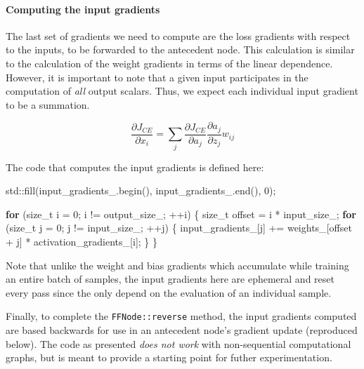 \documentclass[
]{article}
\newenvironment{Shaded}{}{}
\newcommand{\BuiltInTok}[1]{#1}
\newcommand{\ControlFlowTok}[1]{\textcolor[rgb]{0.00,0.44,0.13}{\textbf{#1}}}
\newcommand{\DataTypeTok}[1]{\textcolor[rgb]{0.56,0.13,0.00}{#1}}
\newcommand{\DecValTok}[1]{\textcolor[rgb]{0.25,0.63,0.44}{#1}}
\newcommand{\NormalTok}[1]{#1}
\newcommand{\VariableTok}[1]{\textcolor[rgb]{0.10,0.09,0.49}{#1}}
\begin{document}
\hypertarget{computing-the-input-gradients}{%
\paragraph{Computing the input
gradients}\label{computing-the-input-gradients}}

The last set of gradients we need to compute are the loss gradients with
respect to the inputs, to be forwarded to the antecedent node. This
calculation is similar to the calculation of the weight gradients in
terms of the linear dependence. However, it is important to note that a
given input participates in the computation of \emph{all} output
scalars. Thus, we expect each individual input gradient to be a
summation.

\[
\frac{\partial J_{CE}}{\partial x_i} = \sum_j \frac{\partial J_{CE}}{\partial a_j}\frac{\partial a_j}{\partial z_j}w_{ij}
\]

The code that computes the input gradients is defined here:

\begin{Shaded}
\begin{Highlighting}[]
    \BuiltInTok{std::}\NormalTok{fill(}\VariableTok{input\_gradients\_}\NormalTok{.begin(), }\VariableTok{input\_gradients\_}\NormalTok{.end(), }\DecValTok{0}\NormalTok{);}

    \ControlFlowTok{for}\NormalTok{ (}\DataTypeTok{size\_t}\NormalTok{ i = }\DecValTok{0}\NormalTok{; i != }\VariableTok{output\_size\_}\NormalTok{; ++i)}
\NormalTok{    \{}
        \DataTypeTok{size\_t}\NormalTok{ offset = i * }\VariableTok{input\_size\_}\NormalTok{;}
        \ControlFlowTok{for}\NormalTok{ (}\DataTypeTok{size\_t}\NormalTok{ j = }\DecValTok{0}\NormalTok{; j != }\VariableTok{input\_size\_}\NormalTok{; ++j)}
\NormalTok{        \{}
            \VariableTok{input\_gradients\_}\NormalTok{[j]}
\NormalTok{                += }\VariableTok{weights\_}\NormalTok{[offset + j] * }\VariableTok{activation\_gradients\_}\NormalTok{[i];}
\NormalTok{        \}}
\NormalTok{    \}}
\end{Highlighting}
\end{Shaded}

Note that unlike the weight and bias gradients which accumulate while
training an entire batch of samples, the input gradients here are
ephemeral and reset every pass since the only depend on the evaluation
of an individual sample.

Finally, to complete the \texttt{FFNode::reverse} method, the input
gradients computed are based backwards for use in an antecedent node's
gradient update (reproduced below). The code as presented \emph{does not
work} with non-sequential computational graphs, but is meant to provide
a starting point for futher experimentation.
\end{document}
